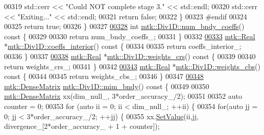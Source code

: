 \begin{DoxyCode}
{{00319     std::cerr << \textcolor{stringliteral}{"Could NOT complete stage 3."} << std::endl;
00320     std::cerr << \textcolor{stringliteral}{"Exiting..."} << std::endl;
00321     \textcolor{keywordflow}{return} \textcolor{keyword}{false};
00322   \}
00323 \textcolor{preprocessor}{  #endif}
00324 
00325   \textcolor{keywordflow}{return} \textcolor{keyword}{true};
00326 \}
00327 
\hypertarget{mtk__div__1d_8cc_source_l00328}{}\hyperlink{classmtk_1_1Div1D_a975cb2a91ed6806f6fc0a3a5b01b01b1}{00328} \textcolor{keywordtype}{int} \hyperlink{classmtk_1_1Div1D_a975cb2a91ed6806f6fc0a3a5b01b01b1}{mtk::Div1D::num\_bndy\_coeffs}()\textcolor{keyword}{ const }\{
00329 
00330   \textcolor{keywordflow}{return} num\_bndy\_coeffs\_;
00331 \}
00332 
\hypertarget{mtk__div__1d_8cc_source_l00333}{}\hyperlink{classmtk_1_1Div1D_a0916b5e84b019b4b6a33d0a45d829513}{00333} \hyperlink{group__c01-roots_gac080bbbf5cbb5502c9f00405f894857d}{mtk::Real} *\hyperlink{classmtk_1_1Div1D_a0916b5e84b019b4b6a33d0a45d829513}{mtk::Div1D::coeffs\_interior}()\textcolor{keyword}{ const }\{
00334 
00335   \textcolor{keywordflow}{return} coeffs\_interior\_;
00336 \}
00337 
\hypertarget{mtk__div__1d_8cc_source_l00338}{}\hyperlink{classmtk_1_1Div1D_ab5c791285e7e51a85b8c62a1b0ab9126}{00338} \hyperlink{group__c01-roots_gac080bbbf5cbb5502c9f00405f894857d}{mtk::Real} *\hyperlink{classmtk_1_1Div1D_ab5c791285e7e51a85b8c62a1b0ab9126}{mtk::Div1D::weights\_crs}()\textcolor{keyword}{ const }\{
00339 
00340   \textcolor{keywordflow}{return} weights\_crs\_;
00341 \}
00342 
\hypertarget{mtk__div__1d_8cc_source_l00343}{}\hyperlink{classmtk_1_1Div1D_a5d4fe8c61ce41cb1134a3f9cb16deb59}{00343} \hyperlink{group__c01-roots_gac080bbbf5cbb5502c9f00405f894857d}{mtk::Real} *\hyperlink{classmtk_1_1Div1D_a5d4fe8c61ce41cb1134a3f9cb16deb59}{mtk::Div1D::weights\_cbs}()\textcolor{keyword}{ const }\{
00344 
00345   \textcolor{keywordflow}{return} weights\_cbs\_;
00346 \}
00347 
\hypertarget{mtk__div__1d_8cc_source_l00348}{}\hyperlink{classmtk_1_1Div1D_a2c844ef39825e73e4024d35fcdd42b12}{00348} \hyperlink{classmtk_1_1DenseMatrix}{mtk::DenseMatrix} \hyperlink{classmtk_1_1Div1D_a2c844ef39825e73e4024d35fcdd42b12}{mtk::Div1D::mim\_bndy}()\textcolor{keyword}{ const }\{
00349 
00350   \hyperlink{classmtk_1_1DenseMatrix}{mtk::DenseMatrix} xx(dim\_null\_, 3*order\_accuracy\_/2);
00351 
00352   \textcolor{keyword}{auto} counter = 0;
00353   \textcolor{keywordflow}{for} (\textcolor{keyword}{auto} ii = 0; ii < dim\_null\_; ++ii) \{
00354     \textcolor{keywordflow}{for}(\textcolor{keyword}{auto} jj = 0; jj < 3*order\_accuracy\_/2; ++jj) \{
00355       xx.\hyperlink{classmtk_1_1DenseMatrix_a784ce5784109ac86bfb9d8562b334b13}{SetValue}(ii,jj, divergence\_[2*order\_accuracy\_ + 1 + counter]);
}}
\end{DoxyCode}
